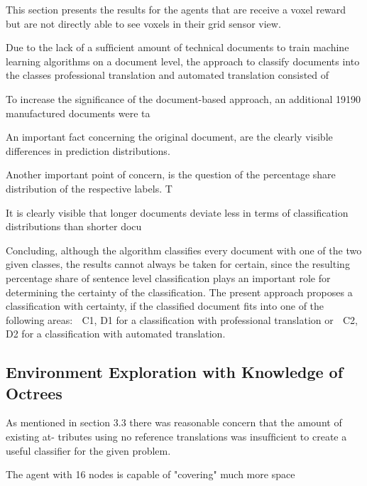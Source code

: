         This section presents the results for the agents that are receive a voxel reward but are not directly able to see voxels in their grid sensor view.

        Due to the lack of a sufﬁcient amount of technical documents to train machine learning
        algorithms on a document level, the approach to classify documents into the classes professional
        translation and automated translation consisted of 
        
        
        
        To increase the signiﬁcance of the document-based approach, an additional 19190 manufactured
        documents were ta
        
        
        An important fact concerning the original document, are the clearly visible differences in
        prediction distributions. 
        
        
        Another important point of concern, is the question of the percentage share distribution
        of the respective labels. T
        
        
        It is clearly visible that longer documents deviate less in terms of classiﬁcation distributions
        than shorter docu
        
        
        
        Concluding, although the algorithm classiﬁes every document with one of the two given
        classes, the results cannot always be taken for certain, since the resulting percentage share
        of sentence level classiﬁcation plays an important role for determining the certainty of
        the classiﬁcation. The present approach proposes a classiﬁcation with certainty, if the
        classiﬁed document ﬁts into one of the following areas:
         C1, D1 for a classiﬁcation with professional translation or
         C2, D2 for a classiﬁcation with automated translation.


    \subsection{Environment Exploration with Knowledge of Octrees}
        
        As mentioned in section 3.3 there was reasonable concern that the amount of existing at-
        tributes using no reference translations was insufﬁcient to create a useful classiﬁer for the
        given problem. 

        The agent with 16 nodes is capable of "covering" much more space 

